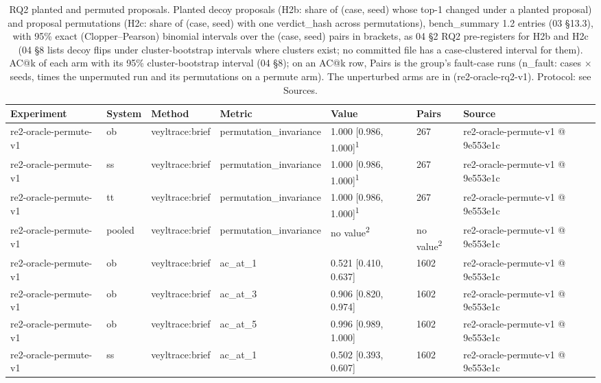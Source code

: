 \begin{table}[t]
\centering
\caption{RQ2 planted and permuted proposals. Planted decoy proposals (H2b: share of (case, seed) whose top-1 changed under a planted proposal) and proposal permutations (H2c: share of (case, seed) with one verdict\_hash across permutations), bench\_summary 1.2 entries (03 \S{}13.3), with 95\% exact (Clopper--Pearson) binomial intervals over the (case, seed) pairs in brackets, as 04 \S{}2 RQ2 pre-registers for H2b and H2c (04 \S{}8 lists decoy flips under cluster-bootstrap intervals where clusters exist; no committed file has a case-clustered interval for them). AC@k of each arm with its 95\% cluster-bootstrap interval (04 \S{}8); on an AC@k row, Pairs is the group's fault-case runs (n\_fault: cases $\times$ seeds, times the unpermuted run and its permutations on a permute arm). The unperturbed arms are in  (re2-oracle-rq2-v1). Protocol: see Sources.}
\label{tab:t06d-rq2-proposal-arms}
\small
\begin{tabular}{lllllll}
\hline
Experiment & System & Method & Metric & Value & Pairs & Source \\
\hline
re2-oracle-permute-v1 & ob & veyltrace:brief & permutation\_invariance & 1.000 [0.986, 1.000]\textsuperscript{1} & 267 & re2-oracle-permute-v1 @ 9e553e1c \\
re2-oracle-permute-v1 & ss & veyltrace:brief & permutation\_invariance & 1.000 [0.986, 1.000]\textsuperscript{1} & 267 & re2-oracle-permute-v1 @ 9e553e1c \\
re2-oracle-permute-v1 & tt & veyltrace:brief & permutation\_invariance & 1.000 [0.986, 1.000]\textsuperscript{1} & 267 & re2-oracle-permute-v1 @ 9e553e1c \\
re2-oracle-permute-v1 & pooled & veyltrace:brief & permutation\_invariance & no value\textsuperscript{2} & no value\textsuperscript{2} & re2-oracle-permute-v1 @ 9e553e1c \\
re2-oracle-permute-v1 & ob & veyltrace:brief & ac\_at\_1 & 0.521 [0.410, 0.637] & 1602 & re2-oracle-permute-v1 @ 9e553e1c \\
re2-oracle-permute-v1 & ob & veyltrace:brief & ac\_at\_3 & 0.906 [0.820, 0.974] & 1602 & re2-oracle-permute-v1 @ 9e553e1c \\
re2-oracle-permute-v1 & ob & veyltrace:brief & ac\_at\_5 & 0.996 [0.989, 1.000] & 1602 & re2-oracle-permute-v1 @ 9e553e1c \\
re2-oracle-permute-v1 & ss & veyltrace:brief & ac\_at\_1 & 0.502 [0.393, 0.607] & 1602 & re2-oracle-permute-v1 @ 9e553e1c \\

\end{tabular}
\end{table}
